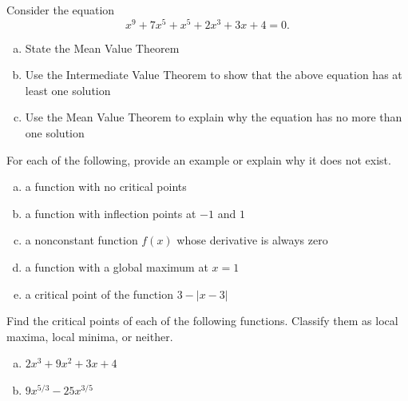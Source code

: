 \documentclass[11pt]{exam}
\theoremstyle{definition}
\begin{document}
\begin{questions}
\newpage
\question[10]\mbox{}
Consider the equation
$$x^9 + 7x^5 + x^5 + 2x^3 + 3x + 4 = 0.$$
\begin{enumerate}[(a)]
\item  State the Mean Value Theorem
\vspace{2in}
\item  Use the Intermediate Value Theorem to show that the above equation has at least one solution
\vspace{3in}
\item  Use the Mean Value Theorem to explain why the equation has no more than one solution
\end{enumerate}

\newpage
\question[10]\mbox{}
For each of the following, provide an example or explain why it does not exist.
\begin{enumerate}[(a)]
\item  a function with no critical points
\vspace{1.2in}
\item  a function with inflection points at $-1$ and $1$
\vspace{1.2in}
\item  a nonconstant function $f(x)$ whose derivative is always zero
\vspace{1.2in}
\item  a function with a global maximum at $x=1$
\vspace{1.2in}
\item  a critical point of the function $3-|x-3|$
\vspace{1.2in}
\end{enumerate}

\newpage
\question[10]\mbox{}
Find the critical points of each of the following functions.
Classify them as local maxima, local minima, or neither.
\begin{enumerate}[(a)]
\item  $2x^3+9x^2+3x+4$
\vspace{4in}
\item  $9x^{5/3}-25x^{3/5}$
\end{enumerate}

\end{questions}
\end{document}

